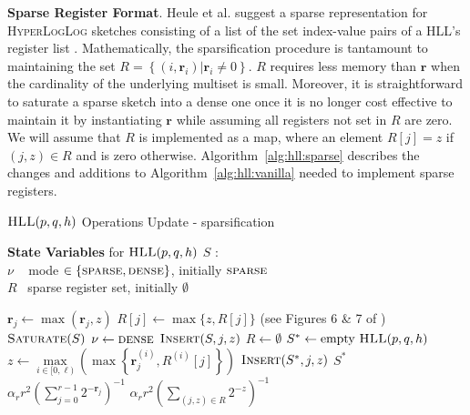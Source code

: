 \documentclass{report}
\newcommand{\algoname}[1]{\textnormal{\textsc{#1}}}
\begin{document}
\vspace{1em}
\textbf{Sparse Register Format}.
Heule et al. suggest a sparse representation for \algoname{HyperLogLog} sketches consisting of a list of the set index-value pairs of a \algoname{HLL}'s register list \cite{heule2013hyperloglog}.
Mathematically, the sparsification procedure is tantamount to maintaining the set $R = \left \{(i, \mathbf{r}_i) | \mathbf{r}_i \neq 0 \right \}$.
$R$ requires less memory than $\mathbf{r}$ when the cardinality of the underlying multiset is small. 
Moreover, it is straightforward to saturate a sparse sketch into a dense one once it is no longer cost effective to maintain it by instantiating $\mathbf{r}$ while assuming all registers not set in $R$ are zero. 
We will assume that $R$ is implemented as a map, where an element $R[j] = z$ if $(j, z) \in R$ and is zero otherwise.
Algorithm~\ref{alg:hll:sparse} describes the changes and additions to Algorithm~\ref{alg:hll:vanilla} needed to implement sparse registers.


\begin{algorithm}[htbp] 
\caption{$\algoname{HLL}(p,q,h)$ Operations  Update - sparsification}\label{alg:hll:sparse}
\begin{flushleft}
        \textbf{State Variables} for $\algoname{HLL}(p, q, h)$ $S$ :		\\
    		\hspace{2.65em}	$\nu$  \,\,\, mode $\in \{\algoname{sparse}, \algoname{dense}\}$, initially $\algoname{sparse}$ \\
    		\hspace{2.65em}	$R$  \, sparse register set, initially $\emptyset$
\end{flushleft}
\begin{algorithmic}[1]
		\If {$\nu = \algoname{dense}$}
			\State $\mathbf{r}_j \gets \max ( \mathbf{r}_j, z)$
		\ElsIf {$\nu = \algoname{sparse}$}
			\State $R[j] \gets \max \{z, R[j]\}$ (see Figures 6 \& 7 of \cite{heule2013hyperloglog})
				\State $\algoname{Saturate}(S)$
			\EndIf
		\EndIf
	\EndFunction
%
		\State $\nu \gets \algoname{dense}$
			\State $\algoname{Insert}(S, j, z)$
		\EndFor
		\State $R \gets \emptyset$
	\EndFunction
%
		\State $S^* \gets \text{empty $\algoname{HLL}(p, q, h)$}$
		\For{$j \in [0,r)$} 
			\State $z \gets  \max\limits_{ i \in [0, \ell)} \left ( \max \left \{ \mathbf{r}^{(i)}_j, R^{(i)}[j] \right \} \right )$
				\State $\algoname{Insert}(S^*, j, z)$
			\EndIf
		\EndFor
		\State \Return $S^*$
	\EndFunction
%
		\If{$\nu = \algoname{dense}$}
			\State \Return $\alpha_r r^2 \left ( \sum\limits_{j=0}^{r-1} 2^{-\mathbf{r}_j} \right) ^{-1}$
		\Else
			\State \Return $\alpha_r r^2 \left ( \sum\limits_{(j, z) \in R} 2^{-z} \right) ^{-1}$
		\EndIf
	\EndFunction
\end{algorithmic}
\end{algorithm}
\end{document}
